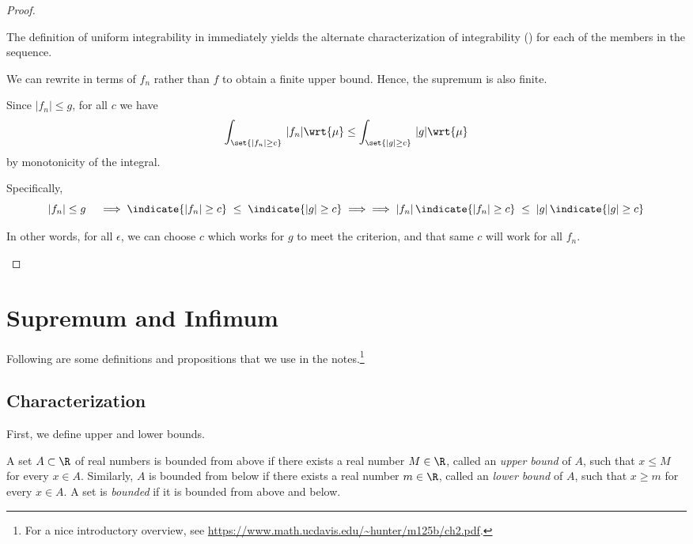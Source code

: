 \documentclass{article} %
\begin{document}
\begin{proof}

\begin{alphabate}
\item The definition of uniform integrability in  immediately yields the alternate characterization of integrability () for each of the members in the sequence.  
\item We can rewrite  in terms of $f_n$ rather than $f$ to obtain a finite upper bound. Hence, the supremum is also finite.
\item Since $|f_n| \leq g$, for all $c$ we have
\[ \int_{\set{|f_n| \geq c}} \, |f_n| \wrt{\mu}  \leq \int_{\set{|g| \geq c}} \, |g| \wrt{\mu}   \]
by monotonicity of the integral.

{\scriptsize Specifically,
\[|f_n| \leq g \quad \implies  \indicate{|f_n| \geq c} \; \leq  \; \indicate{|g| \geq c} \implies \implies  |f_n| \,  \indicate{|f_n| \geq c} \; \leq  \; |g| \, \indicate{|g| \geq c}  \]
}

In other words, for all $\epsilon$, we can choose $c$ which works for $g$ to meet the criterion, and that same $c$ will work for all $f_n$.
\end{alphabate}	
\end{proof}




 
\newpage 
\appendix

\section{Supremum and Infimum}

Following are some definitions and propositions that we use in the notes.\footnote{For a nice introductory overview, see \url{https://www.math.ucdavis.edu/~hunter/m125b/ch2.pdf}.}

\subsection{Characterization}

First, we define upper and lower bounds.
\begin{definition}
A set $A \subset \R$ of real numbers is bounded from above if there exists a real number $M \in \R$, called an \textit{upper bound} of $A$, such that $x \leq M$ for every $x \in A$.  Similarly, $A$  is bounded from below if there exists a real number $m \in \R$, called an \textit{lower bound} of $A$, such that $x \geq m$ for every $x \in A$.  A set is \textit{bounded} if it is bounded from above and below.
\label{def:upper_and_lower_bound}	
\end{definition}
\end{document}
